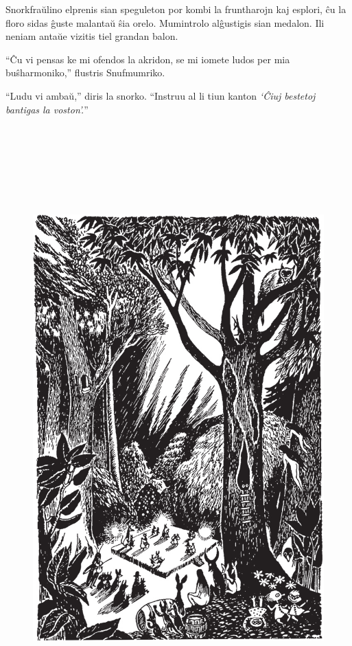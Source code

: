 Snorkfraŭlino elprenis sian speguleton por kombi la fruntharojn kaj esplori, ĉu la floro sidas ĝuste malantaŭ ŝia orelo. Mumintrolo alĝustigis sian medalon. Ili neniam antaŭe vizitis tiel grandan balon.

``Ĉu vi pensas ke mi ofendos la akridon, se mi iomete ludos per mia buŝharmoniko,'' flustris Snufmumriko.

``Ludu vi ambaŭ,'' diris la snorko. ``Instruu al li tiun kanton \emph{`Ĉiuj bestetoj bantigas la voston'.}''

\begin{figure}[htbp]
\centering
\includegraphics[width=450pt,height=658pt]{6-6.png}
\caption{}
\label{6-6}
\end{figure}

